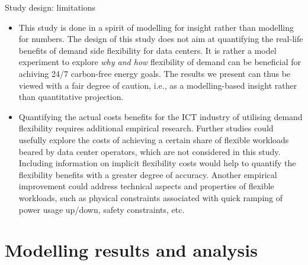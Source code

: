 \begin{frame}{Study design: limitations}
  
  {\footnotesize 
  \begin{itemize}

  \item This study is done in a spirit of \alert{modelling for insight} rather than \alert{modelling for numbers}. The design of this study does not aim at quantifying the real-life benefits of demand side flexibility for data centers. It is rather a model experiment to explore \textit{why and how} flexibility of demand can be beneficial for achiving 24/7 carbon-free energy goals. The results we present can thus be viewed with a fair degree of caution, i.e., as a modelling-based insight rather than quantitative projection. 
  
  \item Quantifying the actual costs benefits for the ICT industry of utilising demand flexibility requires \alert{additional empirical research}. Further studies could usefully explore the costs of achieving a certain share of flexible workloads beared by data center operators, which are \alert{not considered} in this study. Including information on implicit flexibility costs would help to quantify the flexibility benefits with a greater degree of accuracy. Another empirical improvement could address technical aspects and properties of flexible workloads, such as physical constraints associated with quick ramping of power usage up/down, safety constraints, etc.
  
  \end{itemize}
  }
  \end{frame}



\section{Modelling results and analysis}




